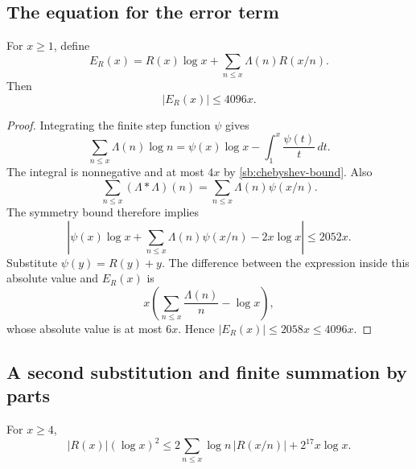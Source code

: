 \subsection{The equation for the error term}
\label{sb:error-subsection}

\begin{lemma}
\label{sb:error-equation}
For $x\ge1$, define
\[
 E_R(x)=R(x)\log x+\sum_{n\le x}\Lambda(n)R(x/n).
\]
Then
\begin{equation}
 |E_R(x)|\le4096x.
 \label{sb:error-bound}
\end{equation}
\end{lemma}

\begin{proof}
Integrating the finite step function $\psi$ gives
\[
 \sum_{n\le x}\Lambda(n)\log n
      =\psi(x)\log x-\int_1^x\frac{\psi(t)}t\,dt.
\]
The integral is nonnegative and at most $4x$ by
\eqref{sb:chebyshev-bound}.  Also
\[
 \sum_{n\le x}(\Lambda*\Lambda)(n)
       =\sum_{n\le x}\Lambda(n)\psi(x/n).
\]
The symmetry bound therefore implies
\[
 \left|\psi(x)\log x+\sum_{n\le x}\Lambda(n)\psi(x/n)
                -2x\log x\right|\le2052x.
\]
Substitute $\psi(y)=R(y)+y$.  The difference between the expression
inside this absolute value and $E_R(x)$ is
\[
 x\left(\sum_{n\le x}\frac{\Lambda(n)}n-\log x\right),
\]
whose absolute value is at most $6x$.  Hence
$|E_R(x)|\le2058x\le4096x$.
\end{proof}

\subsection{A second substitution and finite summation by parts}
\label{sb:weighted-sum-subsection}

\begin{lemma}
\label{sb:weighted-sum}
For $x\ge4$,
\begin{equation}
 |R(x)|(\log x)^2
 \le2\sum_{n\le x}\log n\,|R(x/n)|+2^{17}x\log x.
 \label{sb:weighted-sum-bound}
\end{equation}
\end{lemma}

